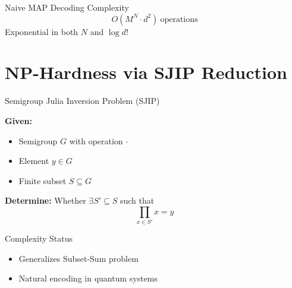 \documentclass[10pt]{beamer}
\begin{document}
\begin{frame}
\begin{block}{Naive MAP Decoding Complexity}
\begin{equation*}
O(M^N \cdot d^2) \ \text{operations}
\end{equation*}
Exponential in both $N$ and $\log d$!
\end{block}
\end{frame}

\section{NP-Hardness via SJIP Reduction}

\begin{frame}{Semigroup Julia Inversion Problem (SJIP)}
\begin{definition}[SJIP]
\textbf{Given:}
\begin{itemize}
\item Semigroup $G$ with operation $\cdot$
\item Element $y \in G$
\item Finite subset $S \subseteq G$
\end{itemize}
\textbf{Determine:} Whether $\exists S' \subseteq S$ such that
\begin{equation*}
\prod_{x \in S'} x = y
\end{equation*}
\end{definition}

\begin{block}{Complexity Status}
\begin{itemize}
\item Generalizes Subset-Sum problem
\item Natural encoding in quantum systems
\end{itemize}
\end{block}
\end{frame}
\end{document}
